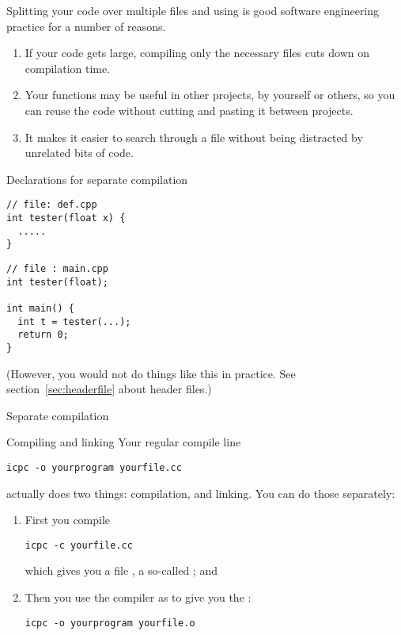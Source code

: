 Splitting your code over multiple
files and using
is good software engineering practice for a number of
reasons. 
\begin{enumerate}
\item If your code gets large, compiling only the necessary files cuts
  down on compilation time.
\item Your functions may be useful in other projects, by yourself or
  others, so you can reuse the code without cutting and pasting it
  between projects.
\item It makes it easier to search through a file without being
  distracted by unrelated bits of code.
\end{enumerate}

\begin{slide}{Declarations for separate compilation}
\label{sl:separate-proto}
\begin{multicols}{2}  
\begin{lstlisting}
// file: def.cpp
int tester(float x) {
  .....
}
\end{lstlisting}
\vfill\columnbreak
\begin{lstlisting}
// file : main.cpp
int tester(float);

int main() {
  int t = tester(...);
  return 0;
}
\end{lstlisting}
\end{multicols}
\end{slide}

(However, you would not do things like this in practice. See 
section~\ref{sec:headerfile} about header files.)

 {Separate compilation}

\begin{block}{Compiling and linking}
  \label{sl:compile-link}
  Your regular compile line
\begin{verbatim}
icpc -o yourprogram yourfile.cc
\end{verbatim}
  actually does two things: compilation, and linking. You can do those
  separately:
  \begin{enumerate}
  \item First you compile
\begin{verbatim}
icpc -c yourfile.cc
\end{verbatim}
  which gives you a file , a so-called
  ; and
  \item Then you use the compiler as  to give you
    the :
\begin{verbatim}
icpc -o yourprogram yourfile.o
\end{verbatim}
  \end{enumerate}
\end{block}

